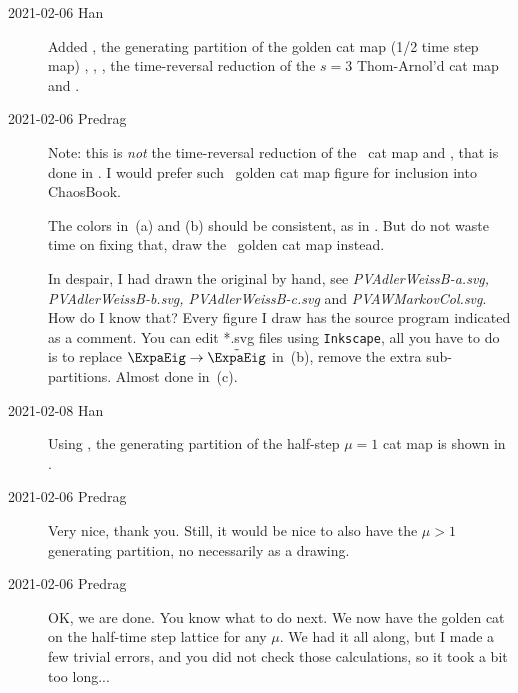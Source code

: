 \begin{description}
    \item[2021-02-06 Han]
Added , the generating partition of the golden
cat map (1/2 time step map) , ,
, the time-reversal reduction of the $s=3$
Thom-Arnol'd cat map  and .

    \item[2021-02-06 Predrag]
Note:
this is \emph{not} the time-reversal reduction  of
the \PV\ cat map  and ,
that %
is done in . I would prefer such \PV\ golden cat
map figure for inclusion into ChaosBook.

The colors in \,(a) and (b) should be consistent,
as in . But do not waste time on fixing that,
draw the \PV\ golden cat map instead.

In despair, I had drawn the original by hand, see
\emph{PVAdlerWeissB-a.svg, PVAdlerWeissB-b.svg, PVAdlerWeissB-c.svg} and
\emph{PVAWMarkovCol.svg}. How do I know that? Every figure I draw has
the source program indicated as a comment. You can edit *.svg files using
\texttt{Inkscape}, all you have to do is to replace $\ExpaEig \to
\tilde{\ExpaEig}$ in \,(b), remove the extra
sub-partitions. Almost done in \,(c).

    \item[2021-02-08 Han]
Using , the generating partition of the half-step
$\mu=1$
{\PV} cat map is shown in .

    \item[2021-02-06 Predrag]
Very nice, thank you. Still, it would be nice to also have the
$\mu>1$ generating partition, no necessarily as a drawing.

    \item[2021-02-06 Predrag]
OK, we are done. You know what to do next.
We now have the golden cat {\jacobianOrb} 
on the half-time step lattice for any
$\mu$. We had it all along, but I made a few trivial errors,
and you did not check those calculations, so it took a bit too long...


\end{description}
